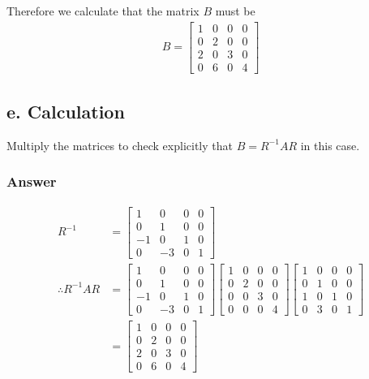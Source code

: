 \documentclass{article}
\begin{document}
		Therefore we calculate that the matrix $B$ must be 
		\begin{align*}
		B=
		\begin{bmatrix}		
		1 & 0 & 0 & 0 \\
		0 & 2 & 0 & 0 \\
		2 & 0 & 3 & 0\\
		0 & 6 & 0 & 4
		\end{bmatrix}
		\end{align*}
		
		\subsection{e. Calculation}
		
		Multiply the matrices to check explicitly that $B=R^{-1}AR$ in this case.
		
		\subsubsection{Answer}
		
		\begin{align*}
		R^{-1}&=
		\begin{bmatrix}
		1 & 0 & 0 & 0\\
		0 & 1 & 0 & 0\\
		-1 & 0 & 1 & 0 \\
		0 &-3 & 0 & 1
		\end{bmatrix}\\
		\therefore R^{-1}AR &=
		\begin{bmatrix}
		1 & 0 & 0 & 0\\
		0 & 1 & 0 & 0\\
		-1 & 0 & 1 & 0 \\
		0 &-3 & 0 & 1
		\end{bmatrix}
		\begin{bmatrix}
		1 & 0 & 0 & 0\\
		0 & 2 & 0 & 0\\
		0 & 0 & 3 & 0\\
		0 & 0 & 0 & 4
		\end{bmatrix}
		\begin{bmatrix}
		1 & 0 & 0 & 0\\
		0 & 1 & 0 & 0\\
		1 & 0 & 1 & 0 \\
		0 &3 & 0 & 1
		\end{bmatrix}\\
		&=\begin{bmatrix}
		1 & 0 & 0 & 0\\
		0 & 2 & 0 & 0 \\
		2 & 0 & 3 & 0 \\
		0 & 6 & 0 & 4
		\end{bmatrix}		
		\end{align*}
		
\end{document}
